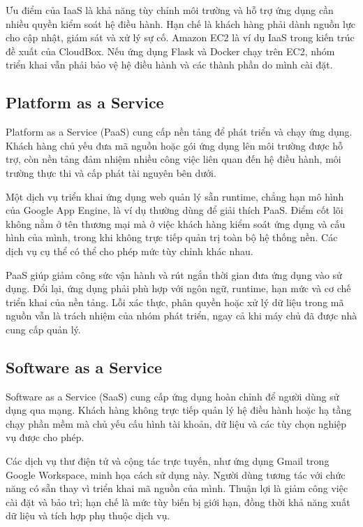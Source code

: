 Ưu điểm của IaaS là khả năng tùy chỉnh môi trường và hỗ trợ ứng dụng cần nhiều quyền kiểm soát hệ điều hành. Hạn chế là khách hàng phải dành nguồn lực cho cập nhật, giám sát và xử lý sự cố. Amazon EC2 là ví dụ IaaS trong kiến trúc đề xuất của CloudBox. Nếu ứng dụng Flask và Docker chạy trên EC2, nhóm triển khai vẫn phải bảo vệ hệ điều hành và các thành phần do mình cài đặt.\cite{shared}

\subsection{Platform as a Service}
Platform as a Service (PaaS) cung cấp nền tảng để phát triển và chạy ứng dụng. Khách hàng chủ yếu đưa mã nguồn hoặc gói ứng dụng lên môi trường được hỗ trợ, còn nền tảng đảm nhiệm nhiều công việc liên quan đến hệ điều hành, môi trường thực thi và cấp phát tài nguyên bên dưới.

Một dịch vụ triển khai ứng dụng web quản lý sẵn runtime, chẳng hạn mô hình của Google App Engine, là ví dụ thường dùng để giải thích PaaS. Điểm cốt lõi không nằm ở tên thương mại mà ở việc khách hàng kiểm soát ứng dụng và cấu hình của mình, trong khi không trực tiếp quản trị toàn bộ hệ thống nền. Các dịch vụ cụ thể có thể cho phép mức tùy chỉnh khác nhau.

PaaS giúp giảm công sức vận hành và rút ngắn thời gian đưa ứng dụng vào sử dụng. Đổi lại, ứng dụng phải phù hợp với ngôn ngữ, runtime, hạn mức và cơ chế triển khai của nền tảng. Lỗi xác thực, phân quyền hoặc xử lý dữ liệu trong mã nguồn vẫn là trách nhiệm của nhóm phát triển, ngay cả khi máy chủ đã được nhà cung cấp quản lý.

\subsection{Software as a Service}
Software as a Service (SaaS) cung cấp ứng dụng hoàn chỉnh để người dùng sử dụng qua mạng. Khách hàng không trực tiếp quản lý hệ điều hành hoặc hạ tầng chạy phần mềm mà chủ yếu cấu hình tài khoản, dữ liệu và các tùy chọn nghiệp vụ được cho phép.

Các dịch vụ thư điện tử và cộng tác trực tuyến, như ứng dụng Gmail trong Google Workspace, minh họa cách sử dụng này. Người dùng tương tác với chức năng có sẵn thay vì triển khai mã nguồn của mình. Thuận lợi là giảm công việc cài đặt và bảo trì; hạn chế là mức tùy biến bị giới hạn, đồng thời khả năng xuất dữ liệu và tích hợp phụ thuộc dịch vụ.

